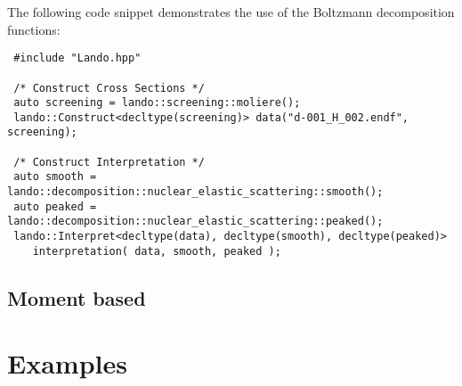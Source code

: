 \documentclass[../main.tex]{subfiles}
\begin{document}
The following code snippet demonstrates the use of the Boltzmann decomposition functions:
\begin{verbatim}
 #include "Lando.hpp"

 /* Construct Cross Sections */
 auto screening = lando::screening::moliere();
 lando::Construct<decltype(screening)> data("d-001_H_002.endf", screening);
 
 /* Construct Interpretation */
 auto smooth = lando::decomposition::nuclear_elastic_scattering::smooth();
 auto peaked = lando::decomposition::nuclear_elastic_scattering::peaked();
 lando::Interpret<decltype(data), decltype(smooth), decltype(peaked)> 
    interpretation( data, smooth, peaked );
\end{verbatim}

\subsection{Moment based}

\section{Examples}
\end{document}
